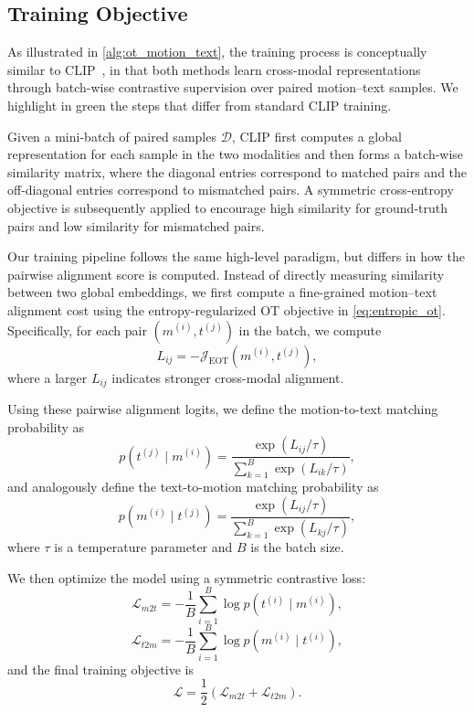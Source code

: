 \subsection{Training Objective}
\label{sec:training}
As illustrated in \cref{alg:ot_motion_text}, the training process is conceptually similar to CLIP~\cite{radford2021learning}, in that both methods learn cross-modal representations through batch-wise contrastive supervision over paired motion--text samples. We highlight in green the steps that differ from standard CLIP training.

Given a mini-batch of paired samples
$\mathcal{D}$,
CLIP first computes a global representation for each sample in the two modalities and then forms a batch-wise similarity matrix, where the diagonal entries correspond to matched pairs and the off-diagonal entries correspond to mismatched pairs. A symmetric cross-entropy objective is subsequently applied to encourage high similarity for ground-truth pairs and low similarity for mismatched pairs.

Our training pipeline follows the same high-level paradigm, but differs in how the pairwise alignment score is computed. Instead of directly measuring similarity between two global embeddings, we first compute a fine-grained motion--text alignment cost using the entropy-regularized OT objective in \cref{eq:entropic_ot}. Specifically, for each pair $(m^{(i)}, t^{(j)})$ in the batch, we compute
\begin{equation}
\label{eq:pairwise_eot}
L_{ij} = -\mathcal{J}_{\mathrm{EOT}}(m^{(i)}, t^{(j)}),
\end{equation}
where a larger $L_{ij}$ indicates stronger cross-modal alignment.

Using these pairwise alignment logits, we define the motion-to-text matching probability as
\begin{equation}
p(t^{(j)} \mid m^{(i)})
=
\frac{\exp(L_{ij}/\tau)}
{\sum_{k=1}^{B}\exp(L_{ik}/\tau)},
\end{equation}
and analogously define the text-to-motion matching probability as
\begin{equation}
p(m^{(i)} \mid t^{(j)})
=
\frac{\exp(L_{ij}/\tau)}
{\sum_{k=1}^{B}\exp(L_{kj}/\tau)},
\end{equation}
where $\tau$ is a temperature parameter and $B$ is the batch size.

We then optimize the model using a symmetric contrastive loss:
\begin{equation}
\mathcal{L}_{m2t}
=
-\frac{1}{B}\sum_{i=1}^{B}
\log p(t^{(i)} \mid m^{(i)}),
\end{equation}
\begin{equation}
\mathcal{L}_{t2m}
=
-\frac{1}{B}\sum_{i=1}^{B}
\log p(m^{(i)} \mid t^{(i)}),
\end{equation}
and the final training objective is
\begin{equation}
\label{eq:final_training_loss}
\mathcal{L}
=
\frac{1}{2}\left(\mathcal{L}_{m2t}+\mathcal{L}_{t2m}\right).
\end{equation}

